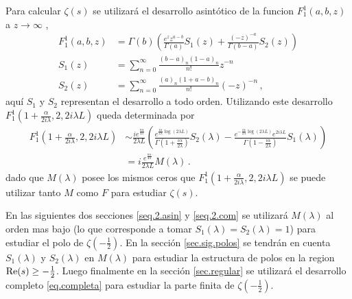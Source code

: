 Para calcular $\zeta(s)$ se utilizará el desarrollo asintótico de la funcion $F _1 ^1 (a,b,z)$ a $z \rightarrow \infty$ \cite{Abramowitz:hyper},
\begin{equation}
\begin{aligned}
    F _1 ^1 (a,b,z) &= \Gamma (b) 
    \left(
    \frac{e^z z ^{a-b} }{\Gamma(a)}  S_1 (z) + \frac{(-z) ^{ -a}}{ \Gamma(b-a)} 
    S_2 (z)
    \right) \\[5pt]
    S _1 (z) &= \sum _{n=0} ^{\infty} \frac{(b-a) _n (1-a) _n}{n!} z ^{-n} \\[5pt]
    S _2 (z) &= \sum _{n=0} ^{\infty} \frac{(a) _n (1+a-b) _n}{n!} (-z) ^{-n}     
		\, ,
\end{aligned}
\label{eq.aprox}
\end{equation}
aquí $S_1$ y $S _2$ representan el desarrollo a todo orden.
Utilizando este desarrollo $F _1 ^1 \left(1+  \frac{  \alpha}{2 i \lambda} ,2 ,2 i \lambda L  \right)$ queda determinada por
\begin{align}
\label{eq.completa}
	F _1 ^1 \left(1+  \frac{  \alpha}{2 i \lambda} ,2 ,2 i \lambda L  \right) 
&	
	\sim
    \frac{i e ^{ \frac{\pi \alpha }{4 \lambda}  } }{2 \lambda L}
    \left(
    \frac{e ^{   \frac{ i \alpha}{2 \lambda}  \log (2 \lambda L) }}               {\Gamma(1+\frac{i \alpha}{2 \lambda})} S _2 ( \lambda )-
    \frac{e ^{-  \frac{i \alpha}{2 \lambda}  \log (2 \lambda L) } e ^{2 i \lambda L} }{\Gamma(1-\frac{i \alpha}{2 \lambda})} 
    S _1 ( \lambda )
    \right) 
\nonumber
\\[5pt]
&
    =  i  \frac{e ^{ \frac{\pi \alpha }{4 \lambda}  } }{2 \lambda L}     M (\lambda) 
    \, .
\end{align}
dado que $M( \lambda)$ posee los mismos ceros que $F _1 ^1 \left(1+  \frac{  \alpha}{2 i \lambda} ,2 ,2 i \lambda L  \right)$ se puede utilizar tanto $M$ como $F$ para estudiar $\zeta (s)$.


En las siguientes dos secciones \ref{seq.2.asin} y \ref{seq.2.com} se utilizará $M ( \lambda )$ al orden mas bajo (lo que corresponde a tomar $S _1 (\lambda) = S _2 ( \lambda )= 1$) para estudiar el polo de $\zeta \left( - \frac{1}{2} \right)$. En la sección \ref{sec.sig.polos} se tendrán en cuenta $S _1 (\lambda)$ y $S _2 ( \lambda )$ en $M ( \lambda)$ para estudiar la estructura de polos en la region ${\rm Re }(s) \geq - \frac{1}{2}$.
Luego finalmente en la sección \ref{sec.regular} se utilizará el desarrollo completo \eqref{eq.completa} para estudiar la parte finita de $\zeta \left( - \frac{1}{2} \right)$.

